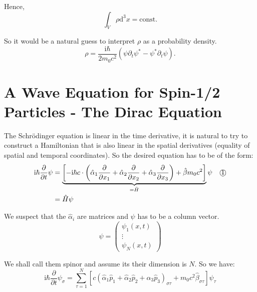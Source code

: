 Hence,
\begin{equation}
\int_V \rho \mathrm{d}^3 x = \text{const.}
\end{equation}

So it would be a natural guess to interpret $\rho$ as a probability density.
\begin{equation}
\rho = \frac{\mathrm{i}\hbar}{2m_0 c^2} (\psi \partial_t \psi^* - \psi^* \partial_t \psi).
\end{equation}

\section{A Wave Equation for Spin-1/2 Particles - The Dirac Equation}

The Schrödinger equation is linear in the time derivative, it is natural to try to construct a Hamiltonian that is also linear in the spatial derivatives (equality of spatial and temporal coordinates). So the desired equation has to be of the form:
\begin{equation}
\begin{aligned}
\mathrm{i}\hbar \frac{\partial}{\partial t} \psi &= \underbrace{\left[ -\mathrm{i}\hbar c \cdot \left( \hat{\alpha}_1 \frac{\partial}{\partial x_1} + \hat{\alpha}_2 \frac{\partial}{\partial x_2} + \hat{\alpha}_3 \frac{\partial}{\partial x_3} \right) + \hat{\beta} m_0 c^2 \right]}_{= \hat{H}} \psi \quad \text{\textcircled{1}} \\
&= \hat{H} \psi
\end{aligned}
\end{equation}

We suspect that the $\hat{\alpha}_i$ are matrices and $\psi$ has to be a column vector.
\begin{equation}
\psi = \begin{pmatrix} \psi_1(x,t) \\ \vdots \\ \psi_N(x,t) \end{pmatrix}
\end{equation}

We shall call them spinor and assume its their dimension is $N$.
So we have:
\begin{equation}
\mathrm{i}\hbar \frac{\partial}{\partial t} \psi_\sigma = \sum_{\tau=1}^N \left[ c (\hat{\alpha}_1 \hat{p}_1 + \hat{\alpha}_2 \hat{p}_2 + \hat{\alpha}_3 \hat{p}_3)_{\sigma\tau} + m_0 c^2 \hat{\beta}_{\sigma\tau} \right] \psi_\tau
\end{equation}

